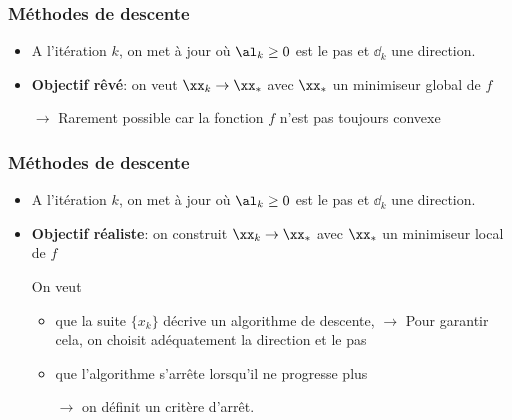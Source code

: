 \documentclass[9pt,table]{beamer} %
\begin{document}
\begin{frame}
\frametitle{Méthodes de descente}

\begin{itemize}[label=\tiny$\blacksquare$]
	\item A l'itération $k$, on met à jour
	où $\al_k \geq 0$ est le \alert{pas} et $\dd_k$ une \alert{direction}.
	
	\pause
	
	\item  \textbf{Objectif rêvé}: on veut $\xx_k \to \xx_*$ avec $\xx_*$ un \alert{minimiseur global} de $f$
	
	\begin{center}
	
	\pause
	
	\end{center}
	
	$\rightarrow$ Rarement possible car la fonction $f$ n'est pas toujours \alert{convexe}
	\end{itemize}
\end{frame}


\begin{frame}
\frametitle{Méthodes de descente}

\begin{itemize}[label=\tiny$\blacksquare$]
	\item A l'itération $k$, on met à jour
	où $\al_k \geq 0$ est le \alert{pas} et $\dd_k$ une \alert{direction}.
	
	\item \textbf{Objectif réaliste}: on construit $\xx_k \to \xx_*$ avec $\xx_*$ un \alert{minimiseur local} de $f$
	
	\begin{center}
	
	
	\end{center}
	
	On veut
	\begin{itemize}[label=-]
	\item que la suite $\{x_k\}$ décrive un \alert{algorithme de descente}, \ie
	$\rightarrow$ Pour garantir cela, on choisit adéquatement la direction et le pas
	\item que l'algorithme s'arrête lorsqu'il ne progresse plus
	
	$\rightarrow$ on définit un \alert{critère d'arrêt}.
	\end{itemize}
	
	
\end{itemize}
\end{frame}
\end{document}
